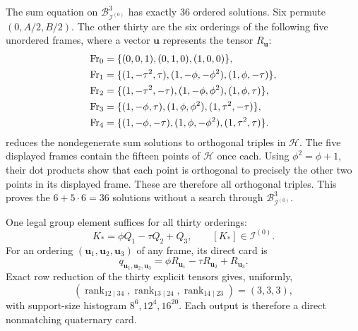 \documentclass[11pt,letterpaper,onecolumn]{article}
\theoremstyle{plain}
\theoremstyle{definition}
\theoremstyle{remark}
\newcommand{\IcoZero}{{\mathcal I^{(0)}}}
\newcommand{\rank}{\operatorname{rank}}
\begin{document}
The sum equation on \(\mathcal B_{\IcoZero}^3\) has exactly \(36\) ordered solutions.
Six permute \((0,A/2,B/2)\). The other thirty are the six orderings of
the following five unordered frames, where a vector \({\mathbf{u}}\) represents
the tensor \(R_{\mathbf{u}}\):
\begin{align}
\mathrm{Fr}_0={}&\{(0,0,1),(0,1,0),(1,0,0)\},\notag\\
\mathrm{Fr}_1={}&\{(1,-\tau^2,\tau),(1,-\phi,-\phi^2),
                         (1,\phi,-\tau)\},\notag\\
\mathrm{Fr}_2={}&\{(1,-\tau^2,-\tau),(1,-\phi,\phi^2),
                         (1,\phi,\tau)\},\notag\\
\mathrm{Fr}_3={}&\{(1,-\phi,\tau),(1,\phi,\phi^2),
                         (1,\tau^2,-\tau)\},\notag\\
\mathrm{Fr}_4={}&\{(1,-\phi,-\tau),(1,\phi,-\phi^2),
                         (1,\tau^2,\tau)\}.
\label{eq:cert-A5-frames}
\end{align}
 reduces the nondegenerate sum
solutions to orthogonal triples in \(\mathcal H\).
The five displayed frames contain the fifteen points of \(\mathcal H\)
once each.  Using \(\phi^2=\phi+1\), their dot products show that each
point is orthogonal to precisely the other two points in its displayed
frame.  These are therefore all orthogonal triples.  This proves the
\(6+5\cdot6=36\) solutions without a search through \(\mathcal B_{\IcoZero}^3\).

One legal group element suffices for all thirty orderings:
\begin{equation*}
 K_*=\phi Q_1-\tau Q_2+Q_3,
 \qquad [K_*]\in\IcoZero.
\end{equation*}
For an ordering \(({\mathbf{u}}_1,{\mathbf{u}}_2,{\mathbf{u}}_3)\) of any frame, its direct card is
\begin{equation}
 q_{{\mathbf{u}}_1,{\mathbf{u}}_2,{\mathbf{u}}_3}
 =\phi R_{{\mathbf{u}}_1}-\tau R_{{\mathbf{u}}_2}+R_{{\mathbf{u}}_3}.
 \label{eq:cert-A5-output}
\end{equation}
Exact row reduction of the thirty explicit tensors gives, uniformly,
\begin{equation}
 (\rank_{12\mid34},\rank_{13\mid24},\rank_{14\mid23})=(3,3,3),
 \label{eq:cert-A5-ranks}
\end{equation}
with support-size histogram \(8^6,12^4,16^{20}\).  Each output is
therefore a direct nonmatching quaternary card.
\end{document}
